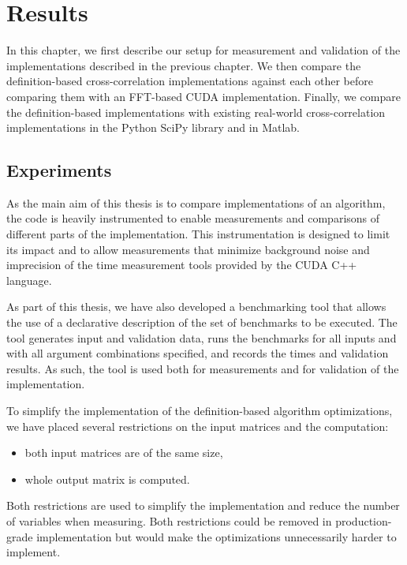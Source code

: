 \chapter{Results}
\label{sec:results}

In this chapter, we first describe our setup for measurement and validation of the implementations described in the previous chapter. We then compare the definition-based cross-correlation implementations against each other before comparing them with an FFT-based CUDA implementation. Finally, we compare the definition-based implementations with existing real-world cross-correlation implementations in the Python SciPy library and in Matlab.

\section{Experiments}
\label{sec:experiments}
As the main aim of this thesis is to compare implementations of an algorithm, the code is heavily instrumented to enable measurements and comparisons of different parts of the implementation. This instrumentation is designed to limit its impact and to allow measurements that minimize background noise and imprecision of the time measurement tools provided by the CUDA C++ language.

As part of this thesis, we have also developed a benchmarking tool that allows the use of a declarative description of the set of benchmarks to be executed. The tool generates input and validation data, runs the benchmarks for all inputs and with all argument combinations specified, and records the times and validation results. As such, the tool is used both for measurements and for validation of the implementation. 

To simplify the implementation of the definition-based algorithm optimizations, we have placed several restrictions on the input matrices and the computation:
\begin{itemize}
	\item both input matrices are of the same size,
	\item whole output matrix is computed.
\end{itemize}

Both restrictions are used to simplify the implementation and reduce the number of variables when measuring. Both restrictions could be removed in production-grade implementation but would make the optimizations unnecessarily harder to implement. 

